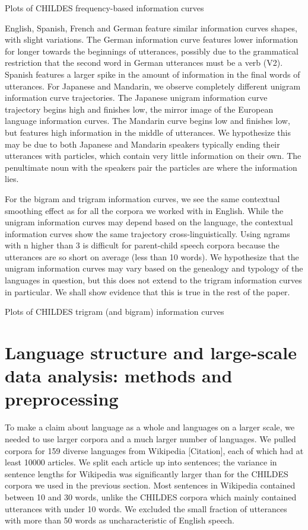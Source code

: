 \documentclass[11pt,]{article}
\begin{document}
Plots of CHILDES frequency-based information curves

English, Spanish, French and German feature similar information curves shapes, with slight variations. The German information curve features lower information for longer towards the beginnings of utterances, possibly due to the grammatical restriction that the second word in German utterances must be a verb (V2). Spanish features a larger spike in the amount of information in the final words of utterances. For Japanese and Mandarin, we observe completely different unigram information curve trajectories. The Japanese unigram information curve trajectory begins high and finishes low, the mirror image of the European language information curves. The Mandarin curve begins low and finishes low, but features high information in the middle of utterances. We hypothesize this may be due to both Japanese and Mandarin speakers typically ending their utterances with particles, which contain very little information on their own. The penultimate noun with the speakers pair the particles are where the information lies.

For the bigram and trigram information curves, we see the same contextual smoothing effect as for all the corpora we worked with in English. While the unigram information curves may depend based on the language, the contextual information curves show the same trajectory cross-linguistically. Using ngrams with n higher than 3 is difficult for parent-child speech corpora because the utterances are so short on average (less than 10 words). We hypothesize that the unigram information curves may vary based on the genealogy and typology of the languages in question, but this does not extend to the trigram information curves in particular. We shall show evidence that this is true in the rest of the paper.

Plots of CHILDES trigram (and bigram) information curves

\hypertarget{language-structure-and-large-scale-data-analysis-methods-and-preprocessing}{%
\section{Language structure and large-scale data analysis: methods and preprocessing}\label{language-structure-and-large-scale-data-analysis-methods-and-preprocessing}}

To make a claim about language as a whole and languages on a larger scale, we needed to use larger corpora and a much larger number of languages. We pulled corpora for 159 diverse languages from Wikipedia {[}Citation{]}, each of which had at least 10000 articles. We split each article up into sentences; the variance in sentence lengths for Wikipedia was significantly larger than for the CHILDES corpora we used in the previous section. Most sentences in Wikipedia contained between 10 and 30 words, unlike the CHILDES corpora which mainly contained utterances with under 10 words. We excluded the small fraction of utterances with more than 50 words as uncharacteristic of English speech.
\end{document}
